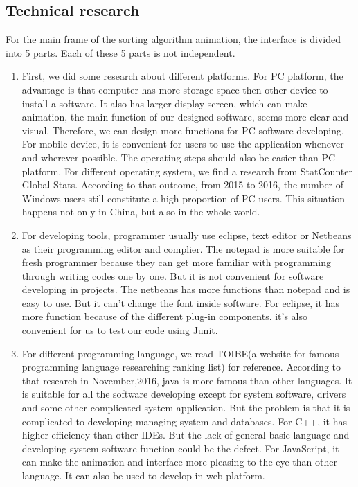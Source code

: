 \documentclass[paper=a4, fontsize=11pt,twoside]{scrartcl}		%
\begin{document}
\subsection{Technical research}
For the main frame of the sorting algorithm animation, the interface is divided into 5 parts. Each of these 5 parts is not independent. 
\begin{enumerate}
	\item First, we did some research about different platforms. For PC platform, the advantage is that computer has more storage space then other device to install a software. It also has larger display screen, which can make animation, the main function of our designed software, seems more clear and visual. Therefore, we can design more functions for PC software developing. For mobile device, it is convenient for users to use the application whenever and wherever possible. The operating steps should also be easier than PC platform. For different operating system, we find a research from StatCounter Global Stats\cite{Stats2016}. According to that outcome, from 2015 to 2016, the number of Windows users still constitute a high proportion of PC users. This situation happens not only in China, but also in the whole world.
    \item For developing tools, programmer usually use eclipse, text editor or Netbeans as their programming editor and complier. The notepad is more suitable for fresh programmer because they can get more familiar with programming through writing codes one by one. But it is not convenient for software developing in projects. The netbeans has more functions than notepad and is easy to use. But it can’t change the font inside software. For eclipse, it has more function because of the different plug-in components. it’s also convenient for us to test our code using Junit. 
    \item For different programming language, we read TOIBE\cite{TIOBE2016}(a website for famous programming language researching ranking list) for reference. According to that research in November,2016, java is more famous than other languages. It is suitable for all the software developing except for system software, drivers and some other complicated system application. But the problem is that it is complicated to developing managing system and databases. For C++, it has higher efficiency than other IDEs. But the lack of general basic language and developing system software function could be the defect. For JavaScript, it can make the animation and interface more pleasing to the eye than other language. It can also be used to develop in web platform. 
	
\end{enumerate}
\end{document}
